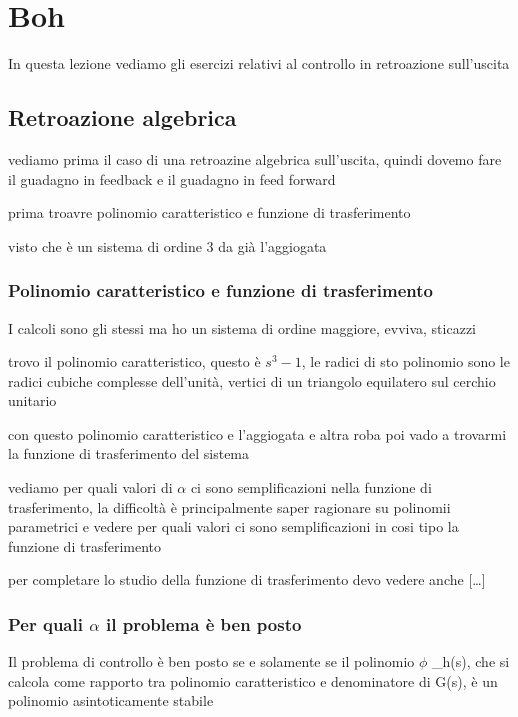 \documentclass[11pt]{article}
\date{\today}
\title{}
\begin{document}
\tableofcontents

\section{Boh}
\label{sec:org48e543d}

In questa lezione vediamo gli esercizi relativi al controllo in retroazione sull'uscita

\subsection{Retroazione algebrica}
\label{sec:org65cf6db}
vediamo prima il caso di una retroazine algebrica sull'uscita, quindi dovemo fare il
guadagno in feedback e il guadagno in feed forward

prima troavre polinomio caratteristico e funzione di trasferimento

visto che è un sistema di ordine 3 da già l'aggiogata

\subsubsection{Polinomio caratteristico e funzione di trasferimento}
\label{sec:orgecec2ea}

I calcoli sono gli stessi ma ho un sistema di ordine maggiore, evviva, sticazzi

trovo il polinomio caratteristico, questo è \(s^3 -1\), le radici di sto polinomio sono le
radici cubiche complesse dell'unità, vertici di un triangolo equilatero sul cerchio
unitario

con questo polinomio caratteristico e l'aggiogata e altra roba poi vado a trovarmi la
funzione di trasferimento del sistema

vediamo per quali valori di \(\alpha\) ci sono semplificazioni nella funzione di
trasferimento, la difficoltà è principalmente saper ragionare su polinomii parametrici e
vedere per quali valori ci sono semplificazioni in cosi tipo la funzione di trasferimento

per completare lo studio della funzione di trasferimento devo vedere anche [\ldots{}]

\subsubsection{Per quali \(\alpha\) il problema è ben posto}
\label{sec:orgebb3d5e}

Il problema di controllo è ben posto se e solamente se il polinomio \(\phi\) \_h(s), che si
calcola come rapporto tra polinomio caratteristico e denominatore di G(s), è un polinomio
asintoticamente stabile
\end{document}
